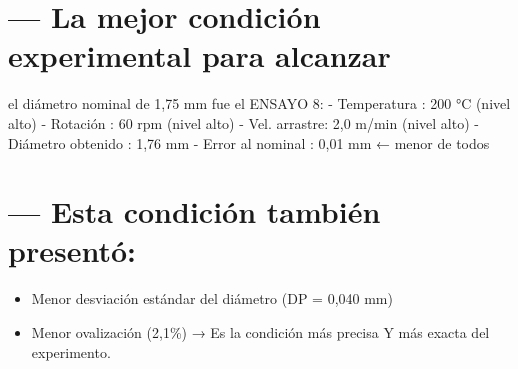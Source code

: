 \documentclass[
]{article}
\providecommand{\tightlist}{%
  \setlength{\itemsep}{0pt}\setlength{\parskip}{0pt}}
\begin{document}
\section{--- La mejor condición experimental para
alcanzar}\label{la-mejor-condiciuxf3n-experimental-para-alcanzar}

el diámetro nominal de 1,75 mm fue el ENSAYO 8: - Temperatura : 200 °C
(nivel alto) - Rotación : 60 rpm (nivel alto) - Vel. arrastre: 2,0 m/min
(nivel alto) - Diámetro obtenido : 1,76 mm - Error al nominal : 0,01 mm
← menor de todos

\section{--- Esta condición también
presentó:}\label{esta-condiciuxf3n-tambiuxe9n-presentuxf3}

\begin{itemize}
\tightlist
\item
  Menor desviación estándar del diámetro (DP = 0,040 mm)
\item
  Menor ovalización (2,1\%) → Es la condición más precisa Y más exacta
  del experimento.
\end{itemize}
\end{document}
